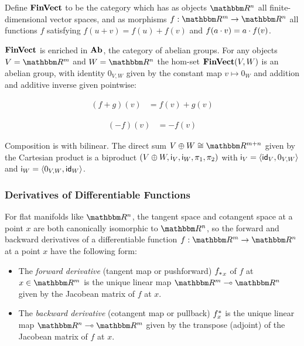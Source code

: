 \begin{definition}
Define $\mathbf{FinVect}$ to be the category which has as objects $\RR^n$ all finite-dimensional vector spaces, and as
morphisms $f: \RR^m \to \RR^n$ all functions $f$ satisfying $f(u + v) = f(u) + f(v)$ and $f(a \cdot v) = a
\cdot f(v)$.
\end{definition}

$\mathbf{FinVect}$ is enriched in $\mathbf{Ab}$, the category of abelian groups. For any objects $V = \RR^m$ and $W = \RR^n$
the hom-set $\mathbf{FinVect}(V,W)$ is an abelian group, with identity $0_{V,W}$ given by the constant map $v \mapsto
0_W$ and addition and additive inverse given pointwise:

\vspace{-4mm}
\begin{center}
\begin{minipage}[t]{0.35\textwidth}
\begin{align*}
(f + g)(v) &= f(v) + g(v)
\end{align*}
\end{minipage}%
\begin{minipage}[t]{0.35\textwidth}
\begin{align*}
(-f)(v) &= -f(v)
\end{align*}
\end{minipage}
\end{center}

\vspace{1mm}
\noindent Composition is with bilinear. The direct sum $V \biprod W \iso \RR^{m + n}$ given by the Cartesian
product is a biproduct $(V \oplus W, \mathsf{i}_{V}, \mathsf{i}_{W}, \pi_1, \pi_2)$ with $\mathsf{i}_{V} =
\langle \mathsf{id}_{V}, 0_{V,W}\rangle$ and $\mathsf{i}_{W} = \langle 0_{V,W}, \mathsf{id}_{W}\rangle$.

\subsubsection{Derivatives of Differentiable Functions}

For flat manifolds like $\RR^n$, the tangent space and cotangent space at a point $x$ are both canonically
isomorphic to $\RR^n$, so the forward and backward derivatives of a differentiable function $f: \RR^m \to
\RR^n$ at a point $x$ have the following form:

\begin{itemize}
\item The \emph{forward derivative} (tangent map or pushforward) ${f_{*}}_x$ of $f$ at $x \in \RR^m$ is the
unique linear map $\RR^m \linearto \RR^n$ given by the Jacobean matrix of $f$ at $x$.
\item The \emph{backward derivative} (cotangent map or pullback) $f^{*}_x$ is the unique linear map
$\RR^n \linearto \RR^m$ given by the transpose (adjoint) of the Jacobean matrix of $f$ at $x$.
\end{itemize}

